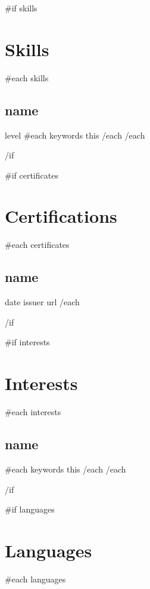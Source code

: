 \documentclass[letterpaper]{article}
\begin{document}
\color{primary-950}
\fontsize{11pt}{16pt}\selectfont

\begin{paracol}{2}
\begin{leftcolumn*}

  {{#if skills}}
  \section*{Skills}{
  {{#each skills}}
    \subsection*{ {{name}} }{
      {{ level }}\newline
      {{#each keywords}}{{ this }}{{/each}}\newline
    }
    {{/each}}
  }
  {{/if}}

  {{#if certificates}}
  \section*{Certifications}{
    {{#each certificates}}
    \subsection*{ {{ name }} } {
      {{ date }}\newline
      {{ issuer }}\newline
      {{ url }}\newline
    }
    {{/each}}
  }
  {{/if}}

  {{#if interests}}
  \section*{Interests} {
    {{#each interests}}
    \subsection*{ {{ name }} } {
      {{#each keywords}}
        {{ this }} 
      {{/each}}\newline
    }
    {{/each}}
  }
  {{/if}}

  {{#if languages}}
  \section*{Languages} {
    {{#each languages}}
}
\end{leftcolumn*}
\end{paracol}
\end{document}
